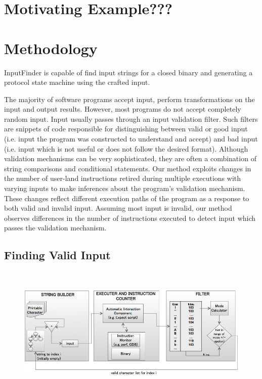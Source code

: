 \documentclass{acm_proc_article-sp}
\def \tool {InputFinder}
\begin{document}
\section{Motivating Example???} \label{example}



\section{Methodology} \label{methodology}

\tool{} is capable of find input strings for a closed binary and generating a protocol state machine using the crafted input.

The majority of software programs accept input, perform transformations on the input and output results.
However, most programs do not accept completely random input.
Input usually passes through an input validation filter.
Such filters are snippets of code responsible for distinguishing between valid or good input (i.e. input the program was constructed to understand and accept) and bad input (i.e. input which is not useful or does not follow the desired format).
Although validation mechanisms can be very sophisticated, they are often a combination of string comparisons and conditional statements.
Our method exploits changes in the number of user-land instructions retired during multiple executions with varying inputs to make inferences about the program's validation mechanism.
These changes reflect different execution paths of the program as a response to both valid and invalid input.
Assuming most input is invalid, our method observes differences in the number of instructions executed to detect input which passes the validation mechanism.


\subsection{Finding Valid Input}

\begin{figure}[t]
\centering
\includegraphics[height=2.5in,width=6.5in]{architecture.png}
\label{fig:architecture}
\caption{}
\end{figure}
\end{document}
